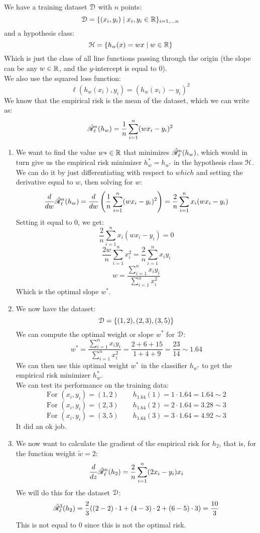 \documentclass[12pt]{article}
\begin{document}
We have a training dataset $\mathcal{D}$ 
with $n$ points:
\[ \mathcal{D} = \{(x_i, y_i) \mid 
x_i, y_i \in \mathbb{R} \}_{i = 1, \dots n} \]
and a hypothesis class:
\[ \mathcal{H} = \{ h_{w}(x) = wx \mid w \in \mathbb{R} \} \]
Which is just the class of all line
functions passing through the origin
(the slope can be any $w \in \mathbb{R}$,
and the $y$-intercept is equal to $0$). \\
We also use the squared loss function:
\[ \ell(h_w(x_i), y_i) = (h_w(x_i) - y_i)^2 \]
We know that the empirical risk
is the mean of the dataset,
which we can write as:
\[ \hat{\mathscr{R}}_\ell^n(h_w)
= \dfrac{1}{n}\sum_{i = 1}^{n}(wx_i - y_i)^2 \]

\begin{enumerate}[label = \letters]
\item 
We want to find the value $w* \in \mathbb{R}$
that minimizes $\hat{\mathscr{R}}_\ell^n(h_w)$,
which would in turn give us the
empirical risk minimizer $h_w^* = h_{w^*}$
in the hypothesis class $\mathcal{H}$. \\
We can do it by just differentiating
with respect to $which$ and setting the derivative
equal to $w$,
then solving for $w$:
\[ \dfrac{d}{dw}\hat{\mathscr{R}}_\ell^n(h_w)
= \dfrac{d}{dw}\left( \dfrac{1}{n}\sum_{i = 1}^{n}
(wx_i - y_i)^2 \right) 
= \dfrac{2}{n}\sum_{i = 1}^{n}x_i(wx_i - y_i) \]
Setting it equal to $0$, we get:
\[ \dfrac{2}{n}\sum_{i = 1}^{n}x_i(wx_i - y_i) = 0 \]
\[ \dfrac{2w}{n}\sum_{i = 1}^{n}x_i^2 
= \dfrac{2}{n}\sum_{i = 1}^{n} x_iy_i \]
\[ w = \dfrac{\sum_{i = 1}^{n}x_iy_i}
{\sum_{i = 1}^{n} x_i^2} \]
Which is the optimal slope $w^*$.
\item
We now have the dataset:
\[ \mathcal{D} = \{ (1, 2), (2, 3), (3, 5)\} \]
We can compute the optimal weight or slope $w^*$
for $\mathcal{D}$:
\[ w^* = \dfrac{\sum_{i = 1}^{n}x_iy_i}
{\sum_{i = 1}^{n} x_i^2}
= \dfrac{2 + 6 + 15}
{1 + 4 + 9} = \dfrac{23}{14} \sim 1.64 \]
We can then use this optimal weight $w^*$
in the classifier $h_{w^*}$
to get the empirical risk minimizer $h_w^*$. \\
We can test its performance on the training
data:
\[ \text{For } (x_i, y_i) = (1, 2) \qquad
h_{1.64}(1) = 1 \cdot 1.64 = 1.64 \sim 2 \]
\[ \text{For } (x_i, y_i) = (2, 3) \qquad
h_{1.64}(2) = 2 \cdot 1.64 = 3.28  \sim 3 \]
\[ \text{For } (x_i, y_i) = (3, 5) \qquad
h_{1.64}(3) = 3 \cdot 1.64 = 4.92  \sim 3 \]
It did an ok job.
\item
We now want to calculate the gradient of the empirical
risk for $h_{2}$,
that is, for the function weight 
$\tilde{w} = 2$:
\[ \dfrac{d}{dz}\hat{\mathscr{R}}_\ell^n(h_2)
= \dfrac{2}{n}\sum_{i = 1}^{n}(2x_i - y_i)x_i \]
We will do this for the dataset $\mathcal{D}$:
\[ \hat{\mathscr{R}}_\ell^3(h_2)
= \dfrac{2}{3}((2-2) \cdot 1 + (4-3) \cdot 2 
+ (6-5) \cdot 3) = \dfrac{10}{3} \]
This is not equal to $0$ since this is not the
optimal risk. \\
\end{enumerate}
\end{document}
